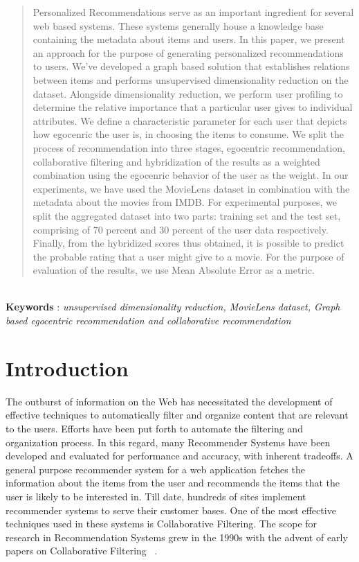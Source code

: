 \documentclass{acm_proc_article-sp}
\begin{document}
\begin{abstract}
Personalized Recommendations serve as an important ingredient for several web based systems. These systems generally house a knowledge base containing the metadata about items and users. In this paper, we present an approach for the purpose of generating personalized recommendations to users. We've developed a graph based solution that establishes relations between items and performs unsupervised dimensionality reduction on the dataset. Alongside dimensionality reduction, we perform user profiling to determine the relative importance that a particular user gives to individual attributes. We define a characteristic parameter for each user that depicts how egocenric the user is, in choosing the items to consume. We split the process of recommendation into three stages, egocentric recommendation, collaborative filtering and hybridization of the results as a weighted combination using the egocenric behavior of the user as the weight. In our experiments, we have used the MovieLens dataset 
in combination with the metadata about the movies from IMDB. For experimental purposes, we split the aggregated dataset into two parts: training set and the test set, comprising of 70 percent and 30 percent of the user data respectively. Finally, from the hybridized scores thus obtained, it is possible to predict the probable rating that a user might give to a movie. For the purpose of evaluation of the results, we use Mean Absolute Error as a metric.
\end{abstract}\\

\textbf{Keywords} : \emph{unsupervised dimensionality reduction, MovieLens dataset, Graph based egocentric recommendation and collaborative recommendation}

\section{Introduction}

The outburst of information on the Web has necessitated the development of effective techniques to automatically filter and organize content that are relevant to the users. Efforts have been put forth to automate the filtering and organization process. In this regard, many Recommender Systems have been developed and evaluated for performance and accuracy, with inherent tradeoffs. A general purpose recommender system for a web application fetches the information about the items from the user and recommends the items that the user is likely to be interested in. Till date, hundreds of sites implement recommender systems to serve their customer bases. One of the most effective techniques used in these systems is Collaborative Filtering. The scope for research in Recommendation Systems grew in the 1990s with the advent of early papers on Collaborative Filtering ~\cite{resnick, shardanand, hill}. 
\end{document}
